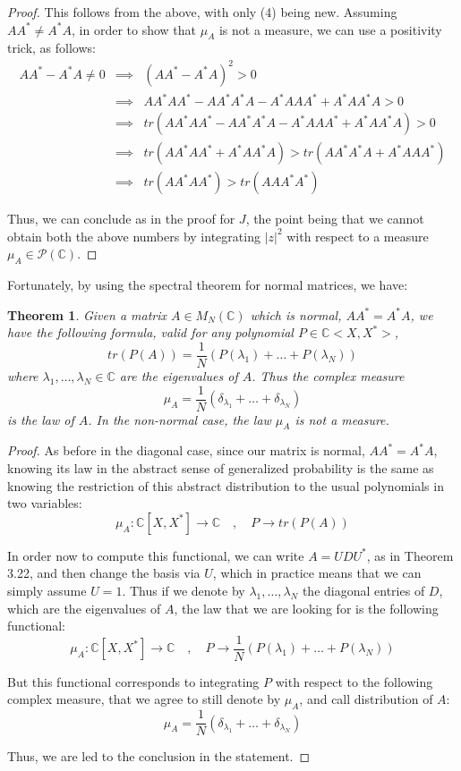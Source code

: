 \documentclass[12pt]{amsbook}
\newtheorem{theorem}{Theorem}[chapter]
\begin{document}
\begin{proof}
This follows from the above, with only (4) being new. Assuming $AA^*\neq A^*A$, in order to show that $\mu_A$ is not a measure, we can use a positivity trick, as follows:
\begin{eqnarray*}
AA^*-A^*A\neq0
&\implies&(AA^*-A^*A)^2>0\\
&\implies&AA^*AA^*-AA^*A^*A-A^*AAA^*+A^*AA^*A>0\\
&\implies&tr(AA^*AA^*-AA^*A^*A-A^*AAA^*+A^*AA^*A)>0\\
&\implies&tr(AA^*AA^*+A^*AA^*A)>tr(AA^*A^*A+A^*AAA^*)\\
&\implies&tr(AA^*AA^*)>tr(AAA^*A^*)
\end{eqnarray*}

Thus, we can conclude as in the proof for $J$, the point being that we cannot obtain both the above numbers by integrating $|z|^2$ with respect to a measure $\mu_A\in\mathcal P(\mathbb C)$.
\end{proof}

Fortunately, by using the spectral theorem for normal matrices, we have:


\begin{theorem}
Given a matrix $A\in M_N(\mathbb C)$ which is normal, $AA^*=A^*A$, we have the following formula, valid for any polynomial $P\in\mathbb C<X,X^*>$,
$$tr(P(A))=\frac{1}{N}(P(\lambda_1)+\ldots+P(\lambda_N))$$
where $\lambda_1,\ldots,\lambda_N\in\mathbb C$ are the eigenvalues of $A$. Thus the complex measure
$$\mu_A=\frac{1}{N}(\delta_{\lambda_1}+\ldots+\delta_{\lambda_N})$$
is the law of $A$. In the non-normal case, the law $\mu_A$ is not a measure.
\end{theorem}

\begin{proof}
As before in the diagonal case, since our matrix is normal, $AA^*=A^*A$, knowing its law in the abstract sense of generalized probability is the same as knowing the restriction of this abstract distribution to the usual polynomials in two variables:
$$\mu_A:\mathbb C[X,X^*]\to\mathbb C\quad,\quad 
P\to tr(P(A))$$

In order now to compute this functional, we can write $A=UDU^*$, as in Theorem 3.22, and then change the basis via $U$, which in practice means that we can simply assume $U=1$. Thus if we denote by $\lambda_1,\ldots,\lambda_N$ the diagonal entries of $D$, which are the eigenvalues of $A$, the law that we are looking for is the following functional:
$$\mu_A:\mathbb C[X,X^*]\to\mathbb C\quad,\quad 
P\to\frac{1}{N}(P(\lambda_1)+\ldots+P(\lambda_N))$$

But this functional corresponds to integrating $P$ with respect to the following complex measure, that we agree to still denote by $\mu_A$, and call distribution of $A$:
$$\mu_A=\frac{1}{N}(\delta_{\lambda_1}+\ldots+\delta_{\lambda_N})$$

Thus, we are led to the conclusion in the statement.
\end{proof}
\end{document}
